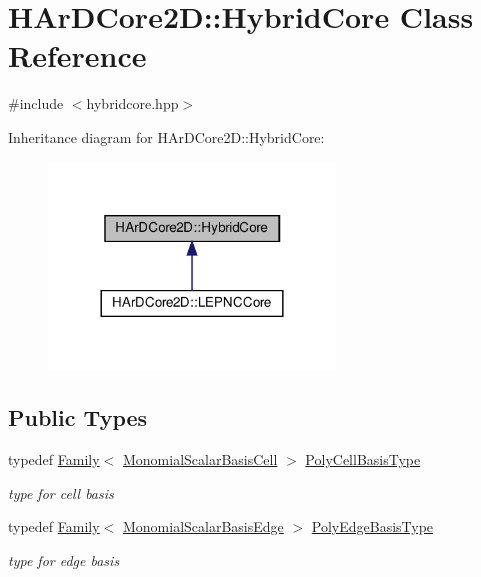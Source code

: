 \hypertarget{classHArDCore2D_1_1HybridCore}{}\section{H\+Ar\+D\+Core2D\+:\+:Hybrid\+Core Class Reference}
\label{classHArDCore2D_1_1HybridCore}


{\ttfamily \#include $<$hybridcore.\+hpp$>$}



Inheritance diagram for H\+Ar\+D\+Core2D\+:\+:Hybrid\+Core\+:
\nopagebreak
\begin{figure}[H]
\begin{center}
\leavevmode
\includegraphics[width=216pt]{classHArDCore2D_1_1HybridCore__inherit__graph}
\end{center}
\end{figure}
\subsection*{Public Types}
\begin{DoxyCompactItemize}
\item 
\mbox{\label{classHArDCore2D_1_1HybridCore_a66e8eccfa5bfc2788b2aec903bd64d4a}} 
typedef \hyperlink{classHArDCore2D_1_1Family}{Family}$<$ \hyperlink{classHArDCore2D_1_1MonomialScalarBasisCell}{Monomial\+Scalar\+Basis\+Cell} $>$ \hyperlink{classHArDCore2D_1_1HybridCore_a66e8eccfa5bfc2788b2aec903bd64d4a}{Poly\+Cell\+Basis\+Type}
\begin{DoxyCompactList}\small\item\em type for cell basis \end{DoxyCompactList}\item 
\mbox{\label{classHArDCore2D_1_1HybridCore_a76550d672e82b1b9e49ea90054b8cc6d}} 
typedef \hyperlink{classHArDCore2D_1_1Family}{Family}$<$ \hyperlink{classHArDCore2D_1_1MonomialScalarBasisEdge}{Monomial\+Scalar\+Basis\+Edge} $>$ \hyperlink{classHArDCore2D_1_1HybridCore_a76550d672e82b1b9e49ea90054b8cc6d}{Poly\+Edge\+Basis\+Type}
\begin{DoxyCompactList}\small\item\em type for edge basis \end{DoxyCompactList}\end{DoxyCompactItemize}
